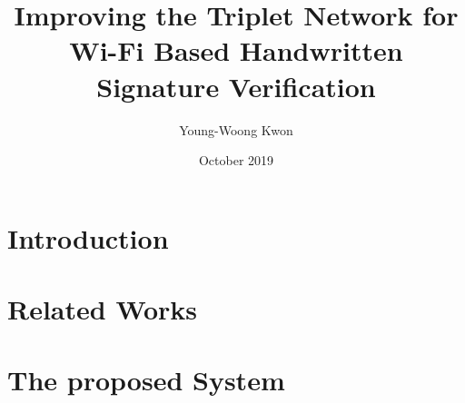\documentclass[a4paper,11pt]{report}
\title{Improving the Triplet Network for Wi-Fi Based Handwritten Signature Verification}
\author{Young-Woong Kwon}
\date{October 2019}
\begin{document}
\makecover
\maketitle

\signaturepage

\pagestyle{plain}
\baselineskip 8.5mm
 \pagestyle{plain}
%
\setcounter{page}{0}
\tableofcontents
\listoffigures
{}
\listoftables
{}

\begin{abstract}

\end{abstract}

\chapter{Introduction}\label{chapter:Introduction}

%

%

\chapter{Related Works}\label{chapter:Related Works}


%

\chapter{The proposed System}\label{chapter:The proposed System}

\end{document}
